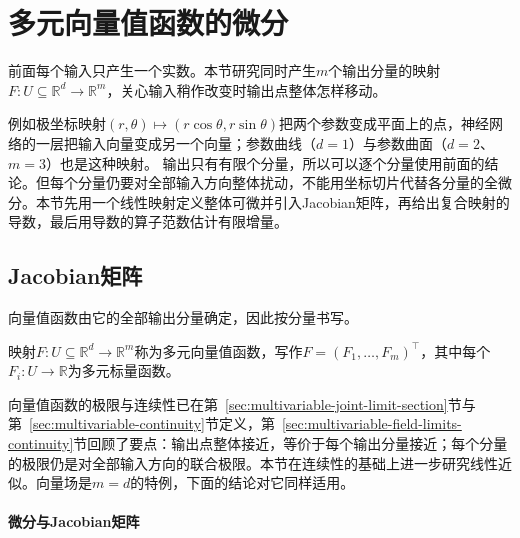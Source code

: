 \section{多元向量值函数的微分}
\label{sec:multivariable-vector-differentiation}

前面每个输入只产生一个实数。本节研究同时产生$m$个输出分量的映射$F:U\subseteq\mathbb R^d\to\mathbb R^m$，关心输入稍作改变时输出点整体怎样移动。

例如极坐标映射$(r,\theta)\mapsto(r\cos\theta,r\sin\theta)$把两个参数变成平面上的点，神经网络的一层把输入向量变成另一个向量；参数曲线（$d=1$）与参数曲面（$d=2$、$m=3$）也是这种映射。
输出只有有限个分量，所以可以逐个分量使用前面的结论。但每个分量仍要对全部输入方向整体扰动，不能用坐标切片代替各分量的全微分。本节先用一个线性映射定义整体可微并引入Jacobian矩阵，再给出复合映射的导数，最后用导数的算子范数估计有限增量。

\subsection{Jacobian矩阵}

向量值函数由它的全部输出分量确定，因此按分量书写。
\begin{definition}[多元向量值函数]
\label{def:multivariable-vector-function}
映射$F:U\subseteq\mathbb R^d\to\mathbb R^m$称为多元向量值函数，写作$F=(F_1,\ldots,F_m)^\top$，其中每个$F_i:U\to\mathbb R$为多元标量函数。
\end{definition}
向量值函数的极限与连续性已在第~\ref{sec:multivariable-joint-limit-section}节与第~\ref{sec:multivariable-continuity}节定义，第~\ref{sec:multivariable-field-limits-continuity}节回顾了要点：输出点整体接近，等价于每个输出分量接近；每个分量的极限仍是对全部输入方向的联合极限。本节在连续性的基础上进一步研究线性近似。向量场是$m=d$的特例，下面的结论对它同样适用。

\paragraph{微分与Jacobian矩阵}

